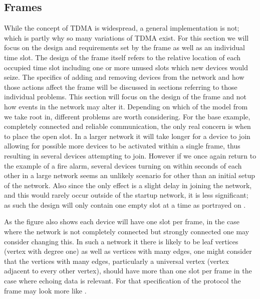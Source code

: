 \subsection{Frames}
While the concept of TDMA is widespread, a general implementation is not; which is partly why so many variations of TDMA exist.
For this section we will focus on the design and requirements set by the frame as well as an individual time slot.
The design of the frame itself refers to the relative location of each occupied time slot including one or more unused slots which new devices would seize.
The specifics of adding and removing devices from the network and how those actions affect the frame will be discussed in sections referring to those individual problems.
This section will focus on the design of the frame and not how events in the network may alter it.
Depending on which of the model from  we take root in, different problems are worth considering.
For the base example, completely connected and reliable communication, the only real concern is when to place the open slot.
In a larger network it will take longer for a device to join allowing for possible more devices to be activated within a single frame, thus resulting in several devices attempting to join.
However if we once again return to the example of a fire alarm, several devices turning on within seconds of each other in a large network seems an unlikely scenario for other than an initial setup of the network.
Also since the only effect is a slight delay in joining the network, and this would rarely occur outside of the startup network, it is less significant; as such the design will only contain one empty slot at a time as portrayed on .

\bigskip \noindent
As the figure also shows each device will have one slot per frame, in the case where the network is not completely connected but strongly connected one may consider changing this.
In such a network it there is likely to be leaf vertices (vertex with degree one) as well as vertices with many edges, one might consider that the vertices with many edges, particularly a universal vertex (vertex adjacent to every other vertex), should have more than one slot per frame in the case where echoing data is relevant.
For that specification of the protocol the frame may look more like .

